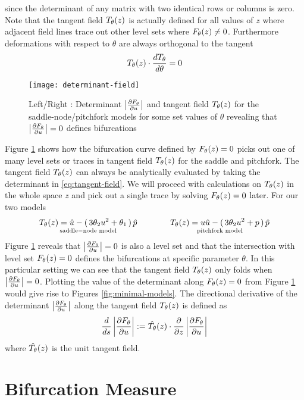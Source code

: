 since the determinant of any matrix with two identical rows or columns is zero. Note that the tangent field $T_{\theta}(z)$ is actually defined for all values of $z$ where adjacent field lines trace out other level sets where $F_{\theta}(z)\neq0$. Furthermore deformations with respect to $\theta$ are always orthogonal to the tangent
\begin{align} %
    \tangent(z)\cdot\frac{d\tangent}{d\theta}=0
\end{align}
\begin{figure}
\centering
\texttt{[image: determinant-field]}
\caption{Left/Right : Determinant $\left| \frac{\partial F_{\theta}}{\partial u} \right|$ and tangent field $T_{\theta}(z)$ for the saddle-node/pitchfork models for some set values of $\theta$ revealing that $\left| \frac{\partial F_{\theta}}{\partial u} \right|=0$ defines bifurcations}
\label{fig:determinant-field}
\end{figure}
Figure \ref{fig:determinant-field} shows how the bifurcation curve defined by $F_{\theta}(z)=0$ picks out one of many level sets or traces in tangent field $T_{\theta}(z)$ for the saddle and pitchfork. The tangent field $T_{\theta}(z)$ can always be analytically evaluated by taking the determinant in \eqref{eq:tangent-field}. We will proceed with calculations on $T_{\theta}(z)$ in the whole space $z$ and pick out a single trace by solving $F_{\theta}(z)=0$ later. For our two models
\begin{align}
    \underset{\mathrm{saddle-node\,\,model}}{
    T_{\theta}(z)=\hat{u}-(\,3\theta_2 u^2+\theta_1\,)\,\hat{p}}
    \qquad\qquad
    \underset{\mathrm{pitchfork\,\,model}}{
    T_{\theta}(z)=u\hat{u}-(\,3\theta_2 u^2+p\,)\,\hat{p}}
    \label{eq:tangent-field-examples}
\end{align}
Figure \ref{fig:determinant-field} reveals that $\left| \frac{\partial F_{\theta}}{\partial u} \right|=0$ is also a level set and that the intersection with level set $F_{\theta}(z)=0$ defines the bifurcations at specific parameter $\theta$. In this particular setting we can see that the tangent field $T_{\theta}(z)$ only folds when $\left| \frac{\partial F_{\theta}}{\partial u} \right|=0$. Plotting the value of the determinant along $F_{\theta}(z)=0$ from Figure \ref{fig:determinant-field} would give rise to Figures \ref{fig:minimal-models}. The directional derivative of the determinant $\left| \frac{\partial F_{\theta}}{\partial u} \right|$ along the tangent field $T_{\theta}(z)$ is defined as
\begin{align}
    \frac{d}{ds}\left| \frac{\partial F_{\theta}}{\partial u} \right| := \hat{T_{\theta}}(z) \cdot \frac{\partial}{\partial z}\left| \frac{\partial F_{\theta}}{\partial u} \right| 
\end{align}
where $\hat{T_{\theta}}(z)$ is the unit tangent field. 


\section{Bifurcation Measure}
\label{appendix:measure}


